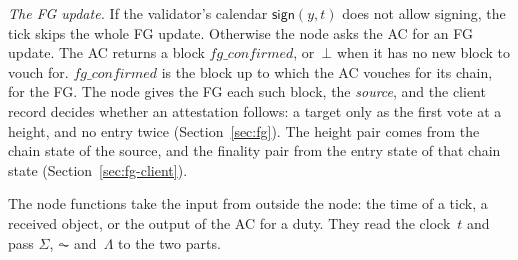 \emph{The FG update.}  If the validator's calendar $\mathsf{sign}(y,t)$
does not allow signing, the tick skips the whole FG update.  Otherwise the
node asks the AC for an FG update.  The AC returns a block
$\mathit{fg\_confirmed}$, or~$\bot$ when
it has no new block to vouch for.
$\mathit{fg\_confirmed}$ is the block up to which the AC vouches for its
chain, for the FG.  The node gives the FG each such block, the
\emph{source}, and the
client record decides whether an attestation follows: a target only as the
first vote at a height, and no entry twice (Section~\ref{sec:fg}).  The
height pair comes from the chain state of the source, and the finality
pair from the entry state of that chain state
(Section~\ref{sec:fg-client}).

The node functions take the input from outside the node: the time of a
tick, a received object, or the output of the AC for a duty.  They read
the clock~$t$ and pass $\Sigma$, $\AC$ and~$\Lambda$ to the two parts.

